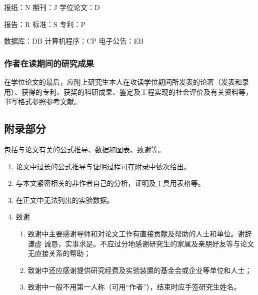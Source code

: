 报纸：N \hspace{2em} 期刊：J \hspace{2em} 学位论文：D \hspace{2em} 

报告：R \hspace{2em} 标准：S \hspace{2em} 专利：P \hspace{2em} 

数据库：DB \hspace{2em} \hspace{2em} 计算机程序：CP 电子公告：EB

\subsubsection{作者在读期间的研究成果}
在学位论文的最后，应附上研究生本人在攻读学位期间所发表的论著（发表和录用）、获得的专利、获奖的科研成果、鉴定及工程实现的社会评价及有关资料等，书写格式参照参考文献。

\subsection{附录部分}
包括与论文有关的公式推导、数据和图表、致谢等。
\begin{enumerate}[1)]
    \item 论文中过长的公式推导与证明过程可在附录中依次给出。
    \item 与本文紧密相关的非作者自己的分析，证明及工具用表格等。
    \item 在正文中无法列出的实验数据。
    \item 致谢
    \begin{enumerate}
        \item 致谢中主要感谢导师和对论文工作有直接贡献及帮助的人士和单位。谢辞谦虚    诚恳，实事求是。不应过分地感谢研究生的家属及亲朋好友等与论文无直接关系的帮助；
        \item 致谢中还应感谢提供研究经费及实验装置的基金会或企业等单位和人士；
        \item 致谢中一般不用第一人称（可用“作者”），结束时应手签研究生姓名。
    \end{enumerate}
\end{enumerate}

